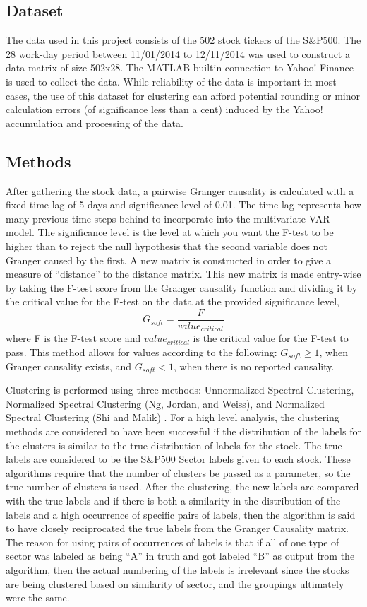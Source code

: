 \documentclass[conference]{IEEEtran}
\begin{document}
\subsection{Dataset}
The data used in this project consists of the 502 stock tickers of the S\&P500. The 28 work-day period between 11/01/2014 to 12/11/2014 was used to construct a data matrix of size 502x28. The MATLAB builtin connection to Yahoo! Finance is used to collect the data. While reliability of the data is important in most cases, the use of this dataset for clustering can afford potential rounding or minor calculation errors (of significance less than a cent) induced by the Yahoo! accumulation and processing of the data.

\subsection{Methods}
After gathering the stock data, a pairwise Granger causality is calculated with a fixed time lag of 5 days and significance level of 0.01. The time lag represents how many previous time steps behind to incorporate into the multivariate VAR model. The significance level is the level at which you want the F-test to be higher than to reject the null hypothesis that the second variable does not Granger caused by the first. A new matrix is constructed in order to give a measure of ``distance'' to the distance matrix. This new matrix is made entry-wise by taking the F-test score from the Granger causality function and dividing it by the critical value for the F-test on the data at the provided significance level, $$G_{soft} = \frac{F}{value_{critical}} $$ where F is the F-test score and $value_{critical}$ is the critical value for the F-test to pass. This method allows for values according to the following:
$G_{soft} \geq 1 $, when Granger causality exists, and $ G_{soft} < 1$, when there is no reported causality.

Clustering is performed using three methods: Unnormalized Spectral Clustering, Normalized Spectral Clustering (Ng, Jordan, and Weiss), and Normalized Spectral Clustering (Shi and Malik) \cite{Luxburg}. For a high level analysis, the clustering methods are considered to have been successful if the distribution of the labels for the clusters is similar to the true distribution of labels for the stock. The true labels are considered to be the S\&P500 Sector labels given to each stock. These algorithms require that the number of clusters be passed as a parameter, so the true number of clusters is used. After the clustering, the new labels are compared with the true labels and if there is both a similarity in the distribution of the labels and a high occurrence of specific pairs of labels, then the algorithm is said to have closely reciprocated the true labels from the Granger Causality matrix. The reason for using pairs of occurrences of labels is that if all of one type of sector was labeled as being ``A'' in truth and got labeled ``B'' as output from the algorithm, then the actual numbering of the labels is irrelevant since the stocks are being clustered based on similarity of sector, and the groupings ultimately were the same.
\end{document}
